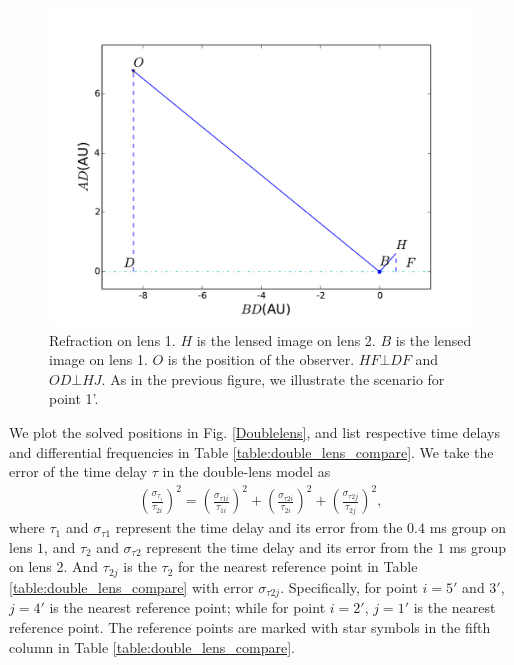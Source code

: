 \documentclass[useAMS,usenatbib]{mn2e}
\begin{document}
\begin{figure}
\centering
\includegraphics[width=1.0\linewidth]{Second_reflection_Nov25.pdf}
\caption{Refraction on lens 1. 
$H$ is the lensed image on lens 2.  $B$ is the lensed image on lens 1.  $O$ is the position of the observer. $HF\bot DF$ and $OD\bot HJ$.  As in the previous figure, we illustrate the scenario for point 1'. }
\label{second_reflect}
\end{figure}



We plot the solved positions in Fig. \ref{Doublelens}, and list
respective time delays and differential frequencies in
Table \ref{table:double_lens_compare}.  
We take the error of the time delay $\tau$
in the double-lens model as
\begin{equation}
\begin{aligned}
(\frac{\sigma_{\tau_i}}{\tau_{2i}})^2 = (\frac{\sigma_{\tau1i}}{\tau_{1i}})^2+(\frac{\sigma_{\tau2i}}{\tau_{2i}})^2 + (\frac{\sigma_{\tau2j}}{\tau_{2j}})^2,
\end{aligned}
\end{equation}
where $\tau_1$ and $\sigma_{\tau1}$ represent the time delay and its
error from the $0.4$ ms group on lens $1$, and $\tau_2$ and
$\sigma_{\tau2}$ represent the time delay and its error from
the $1$ ms group on lens 2.  And $\tau_{2j}$ is the $\tau_2$ for
the nearest reference point in Table
\ref{table:double_lens_compare} with error $\sigma_{\tau2j}$.  
Specifically,
for point $i=5'$ and $3'$, $j=4'$ is the nearest reference point; while for point $i=2'$, $j=1'$ is the nearest reference point.  The reference points are marked with star symbols in the fifth column in Table \ref{table:double_lens_compare}.
\end{document}
